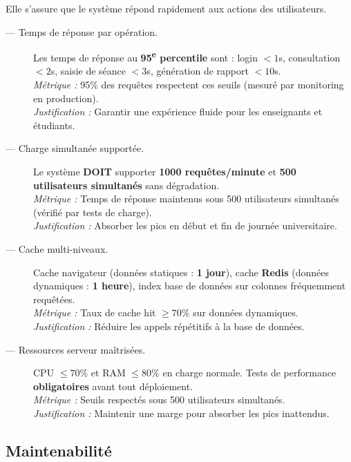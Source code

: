 Elle s'assure que le système répond rapidement aux actions des
utilisateurs.

\begin{description}

    \item[ — Temps de réponse par opération.]
    Les temps de réponse au \textbf{95\textsuperscript{e} percentile} sont :
    login $< 1$s, consultation $< 2$s, saisie de séance $< 3$s,
    génération de rapport $< 10$s.\\
    \textit{Métrique :} 95\% des requêtes respectent ces seuils
    (mesuré par monitoring en production).\\
    \textit{Justification :} Garantir une expérience fluide pour
    les enseignants et étudiants.

    \item[ — Charge simultanée supportée.]
    Le système \textbf{DOIT} supporter \textbf{1000 requêtes/minute}
    et \textbf{500 utilisateurs simultanés} sans dégradation.\\
    \textit{Métrique :} Temps de réponse maintenus sous 500 utilisateurs
    simultanés (vérifié par tests de charge).\\
    \textit{Justification :} Absorber les pics en début et fin de
    journée universitaire.

    \item[ — Cache multi-niveaux.]
    Cache navigateur (données statiques : \textbf{1 jour}), cache
    \textbf{Redis} (données dynamiques : \textbf{1 heure}), index base
    de données sur colonnes fréquemment requêtées.\\
    \textit{Métrique :} Taux de cache hit $\geq 70\%$ sur données dynamiques.\\
    \textit{Justification :} Réduire les appels répétitifs à la
    base de données.

    \item[ — Ressources serveur maîtrisées.]
    CPU $\leq 70\%$ et RAM $\leq 80\%$ en charge normale. Tests de
    performance \textbf{obligatoires} avant tout déploiement.\\
    \textit{Métrique :} Seuils respectés sous 500 utilisateurs simultanés.\\
    \textit{Justification :} Maintenir une marge pour absorber
    les pics inattendus.

\end{description}



\subsection{Maintenabilité}



